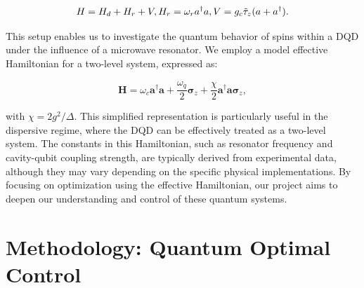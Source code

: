\documentclass[12pt]{report}
\begin{document}
\[
\begin{equation}
    H = H_d + H_r + V, \\
    H_r = \omega_r a^{\dagger} a, \\
    V = g_c \tilde{\tau}_z(a + a^{\dagger}) .
\end{equation}
\]

This setup enables us to investigate the quantum behavior of spins within a DQD under the influence of a microwave resonator. We employ a model effective Hamiltonian for a two-level system, expressed as:

\[
\begin{equation}
    \boldsymbol{H} = \omega_c \boldsymbol{a}^{\dagger} \boldsymbol{a} + \frac{\omega_q}{2} \boldsymbol{\sigma}_z + \frac{\chi}{2} \boldsymbol{a}^{\dagger} \boldsymbol{a} \boldsymbol{\sigma}_z,    
\end{equation}
\]

with \( \chi = 2 g^2 / \Delta \). This simplified representation is particularly useful in the dispersive regime, where the DQD can be effectively treated as a two-level system. The constants in this Hamiltonian, such as resonator frequency and cavity-qubit coupling strength, are typically derived from experimental data, although they may vary depending on the specific physical implementations. By focusing on optimization using the effective Hamiltonian, our project aims to deepen our understanding and control of these quantum systems.

\chapter{Methodology: Quantum Optimal Control}\label{sec:methodology}
\end{document}
